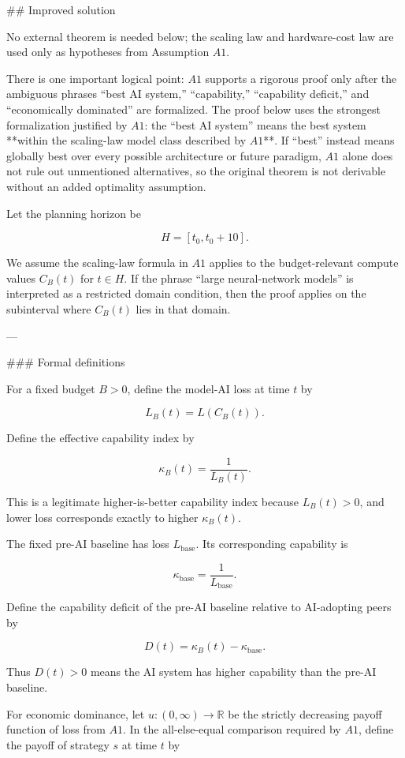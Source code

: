 ## Improved solution

No external theorem is needed below; the scaling law and hardware-cost law are used only as hypotheses from Assumption \(A1\).

There is one important logical point: \(A1\) supports a rigorous proof only after the ambiguous phrases “best AI system,” “capability,” “capability deficit,” and “economically dominated” are formalized. The proof below uses the strongest formalization justified by \(A1\): the “best AI system” means the best system **within the scaling-law model class described by \(A1\)**. If “best” instead means globally best over every possible architecture or future paradigm, \(A1\) alone does not rule out unmentioned alternatives, so the original theorem is not derivable without an added optimality assumption.

Let the planning horizon be

\[
H=[t_0,t_0+10].
\]

We assume the scaling-law formula in \(A1\) applies to the budget-relevant compute values \(C_B(t)\) for \(t\in H\). If the phrase “large neural-network models” is interpreted as a restricted domain condition, then the proof applies on the subinterval where \(C_B(t)\) lies in that domain.

---

### Formal definitions

For a fixed budget \(B>0\), define the model-AI loss at time \(t\) by

\[
L_B(t)=L(C_B(t)).
\]

Define the effective capability index by

\[
\kappa_B(t)=\frac{1}{L_B(t)}.
\]

This is a legitimate higher-is-better capability index because \(L_B(t)>0\), and lower loss corresponds exactly to higher \(\kappa_B(t)\).

The fixed pre-AI baseline has loss \(L_{\mathrm{base}}\). Its corresponding capability is

\[
\kappa_{\mathrm{base}}=\frac{1}{L_{\mathrm{base}}}.
\]

Define the capability deficit of the pre-AI baseline relative to AI-adopting peers by

\[
D(t)=\kappa_B(t)-\kappa_{\mathrm{base}}.
\]

Thus \(D(t)>0\) means the AI system has higher capability than the pre-AI baseline.

For economic dominance, let \(u:(0,\infty)\to \mathbb{R}\) be the strictly decreasing payoff function of loss from \(A1\). In the all-else-equal comparison required by \(A1\), define the payoff of strategy \(s\) at time \(t\) by

